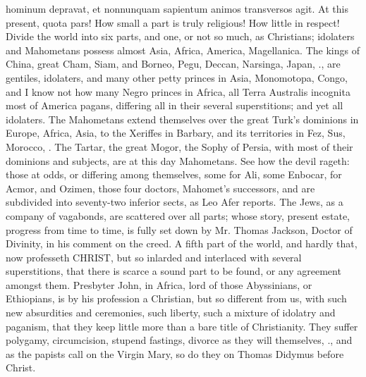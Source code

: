{hominum depravat, et nonnunquam sapientum animos transversos agit. At
this present, quota pars! How small a part is truly religious! How
little in respect! Divide the world into six parts, and one, or not so
much, as Christians; idolaters and Mahometans possess almost Asia,
Africa, America, Magellanica. The kings of China, great Cham, Siam, and
Borneo, Pegu, Deccan, Narsinga, Japan, \etc{}., are gentiles, idolaters,
and many other petty princes in Asia, Monomotopa, Congo, and I know not
how many Negro princes in Africa, all Terra Australis incognita most of
America pagans, differing all in their several superstitions; and yet
all idolaters. The Mahometans extend themselves over the great Turk's
dominions in Europe, Africa, Asia, to the Xeriffes in Barbary, and its
territories in Fez, Sus, Morocco, \etc{}. The Tartar, the great Mogor, the
Sophy of Persia, with most of their dominions and subjects, are at this
day Mahometans. See how the devil rageth: those at odds, or differing
among themselves, some for Ali, some Enbocar, for Acmor, and
Ozimen, those four doctors, Mahomet's successors, and are subdivided
into seventy-two inferior sects, as Leo Afer reports. The Jews,
as a company of vagabonds, are scattered over all parts; whose story,
present estate, progress from time to time, is fully set down by
Mr. Thomas Jackson, Doctor of Divinity, in his comment on the
creed. A fifth part of the world, and hardly that, now professeth
\textsc{CHRIST}, but so inlarded and interlaced with several superstitions, that
there is scarce a sound part to be found, or any agreement amongst
them. Presbyter John, in Africa, lord of those Abyssinians, or
Ethiopians, is by his profession a Christian, but so different from us,
with such new absurdities and ceremonies, such liberty, such a mixture
of idolatry and paganism, that they keep little more than a bare
title of Christianity. They suffer polygamy, circumcision, stupend
fastings, divorce as they will themselves, \etc{}., and as the papists call
on the Virgin Mary, so do they on Thomas Didymus before Christ.

}
